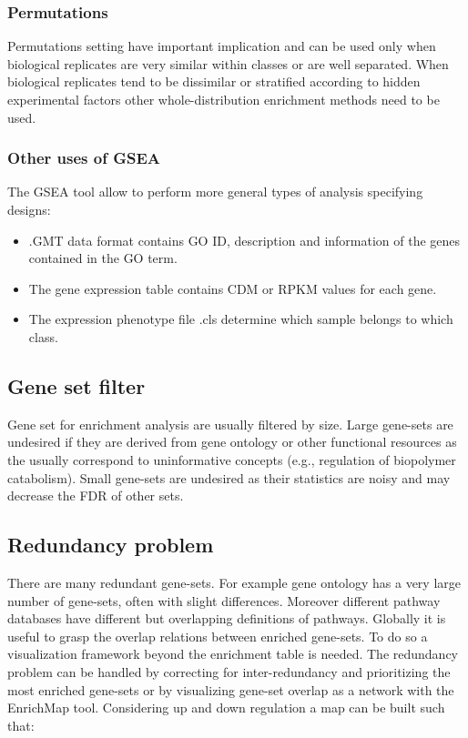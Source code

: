 		\subsubsection{Permutations}
		Permutations setting have important implication and can be used only when biological replicates are very similar within classes or are well separated.
		When biological replicates tend to be dissimilar or stratified according to hidden experimental factors other whole-distribution enrichment methods need to be used.

		\subsubsection{Other uses of GSEA}
		The GSEA tool allow to perform more general types of analysis specifying designs:
		
			\begin{itemize}
				\item .GMT data format contains GO ID, description and information of the genes contained in the GO term.
				\item The gene expression table contains CDM or RPKM values for each gene.
				\item The expression phenotype file .cls determine which sample belongs to which class.
			\end{itemize}


	\subsection{Gene set filter}
	Gene set for enrichment analysis are usually filtered by size.
	Large gene-sets are undesired if they are derived from gene ontology or other functional resources as the usually correspond to uninformative concepts (e.g., regulation of biopolymer catabolism).
	Small gene-sets are undesired as their statistics are noisy and may decrease the FDR of other sets.

	\subsection{Redundancy problem}
	There are many redundant gene-sets.
	For example gene ontology has a very large number of gene-sets, often with slight differences.
	Moreover different pathway databases have different but overlapping definitions of pathways.
	Globally it is useful to grasp the overlap relations between enriched gene-sets.
	To do so a visualization framework beyond the enrichment table is needed.
	The redundancy problem can be handled by correcting for inter-redundancy and prioritizing the most enriched gene-sets or by visualizing gene-set overlap as a network with the EnrichMap tool.
	Considering up and down regulation a map can be built such that:

